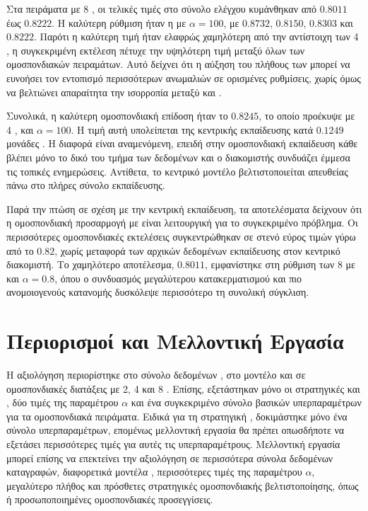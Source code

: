 Στα πειράματα με 8 , οι τελικές τιμές  στο σύνολο ελέγχου κυμάνθηκαν από \(0.8011\) έως \(0.8222\). Η καλύτερη ρύθμιση ήταν η  με \(\alpha=100\), με  \(0.8732\),  \(0.8150\),  \(0.8303\) και  \(0.8222\). Παρότι η καλύτερη τιμή  ήταν ελαφρώς χαμηλότερη από την αντίστοιχη των 4 , η συγκεκριμένη εκτέλεση πέτυχε την υψηλότερη τιμή  μεταξύ όλων των ομοσπονδιακών πειραμάτων. Αυτό δείχνει ότι η αύξηση του πλήθους των  μπορεί να ευνοήσει τον εντοπισμό περισσότερων ανωμαλιών σε ορισμένες ρυθμίσεις, χωρίς όμως να βελτιώνει απαραίτητα την ισορροπία μεταξύ  και .

Συνολικά, η καλύτερη ομοσπονδιακή επίδοση ήταν το  \(0.8245\), το οποίο προέκυψε με 4 ,  και \(\alpha=100\). Η τιμή αυτή υπολείπεται της κεντρικής εκπαίδευσης κατά \(0.1249\) μονάδες . Η διαφορά είναι αναμενόμενη, επειδή στην ομοσπονδιακή εκπαίδευση κάθε  βλέπει μόνο το δικό του τμήμα των δεδομένων και ο διακομιστής συνδυάζει έμμεσα τις τοπικές ενημερώσεις. Αντίθετα, το κεντρικό μοντέλο βελτιστοποιείται απευθείας πάνω στο πλήρες σύνολο εκπαίδευσης.

Παρά την πτώση σε σχέση με την κεντρική εκπαίδευση, τα αποτελέσματα δείχνουν ότι η ομοσπονδιακή προσαρμογή με  είναι λειτουργική για το συγκεκριμένο πρόβλημα. Οι περισσότερες ομοσπονδιακές εκτελέσεις συγκεντρώθηκαν σε στενό εύρος τιμών  γύρω από το \(0.82\), χωρίς μεταφορά των αρχικών δεδομένων εκπαίδευσης στον κεντρικό διακομιστή. Το χαμηλότερο αποτέλεσμα, \(0.8011\), εμφανίστηκε στη ρύθμιση των 8  με  και \(\alpha=0.8\), όπου ο συνδυασμός μεγαλύτερου κατακερματισμού και πιο ανομοιογενούς κατανομής δυσκόλεψε περισσότερο τη συνολική σύγκλιση.


\section{Περιορισμοί και Μελλοντική Εργασία}

Η αξιολόγηση περιορίστηκε στο σύνολο δεδομένων , στο μοντέλο  και σε ομοσπονδιακές διατάξεις με 2, 4 και 8 . Επίσης, εξετάστηκαν μόνο οι στρατηγικές  και , δύο τιμές της παραμέτρου \(\alpha\) και ένα συγκεκριμένο σύνολο βασικών υπερπαραμέτρων για τα ομοσπονδιακά πειράματα. Ειδικά για τη στρατηγική , δοκιμάστηκε μόνο ένα σύνολο υπερπαραμέτρων, επομένως μελλοντική εργασία θα πρέπει οπωσδήποτε να εξετάσει περισσότερες τιμές για αυτές τις υπερπαραμέτρους. Μελλοντική εργασία μπορεί επίσης να επεκτείνει την αξιολόγηση σε περισσότερα σύνολα δεδομένων καταγραφών, διαφορετικά μοντέλα , περισσότερες τιμές της παραμέτρου \(\alpha\), μεγαλύτερο πλήθος  και πρόσθετες στρατηγικές ομοσπονδιακής βελτιστοποίησης, όπως  ή προσωποποιημένες ομοσπονδιακές προσεγγίσεις.

